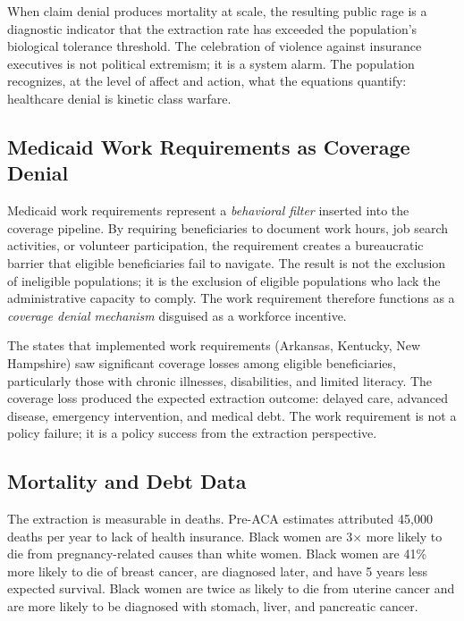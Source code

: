 \begin{keyinsight}
When claim denial produces mortality at scale, the resulting public rage is a diagnostic indicator that the extraction rate has exceeded the population's biological tolerance threshold. The celebration of violence against insurance executives is not political extremism; it is a system alarm. The population recognizes, at the level of affect and action, what the equations quantify: healthcare denial is kinetic class warfare.
\end{keyinsight}

\subsection{Medicaid Work Requirements as Coverage Denial}

Medicaid work requirements represent a \textit{behavioral filter} inserted into the coverage pipeline. By requiring beneficiaries to document work hours, job search activities, or volunteer participation, the requirement creates a bureaucratic barrier that eligible beneficiaries fail to navigate. The result is not the exclusion of ineligible populations; it is the exclusion of eligible populations who lack the administrative capacity to comply. The work requirement therefore functions as a \textit{coverage denial mechanism} disguised as a workforce incentive.

The states that implemented work requirements (Arkansas, Kentucky, New Hampshire) saw significant coverage losses among eligible beneficiaries, particularly those with chronic illnesses, disabilities, and limited literacy. The coverage loss produced the expected extraction outcome: delayed care, advanced disease, emergency intervention, and medical debt. The work requirement is not a policy failure; it is a policy success from the extraction perspective.

\subsection{Mortality and Debt Data}

The extraction is measurable in deaths. Pre-ACA estimates attributed 45,000 deaths per year to lack of health insurance. Black women are 3$\times$ more likely to die from pregnancy-related causes than white women. Black women are 41\% more likely to die of breast cancer, are diagnosed later, and have 5 years less expected survival. Black women are twice as likely to die from uterine cancer and are more likely to be diagnosed with stomach, liver, and pancreatic cancer.

